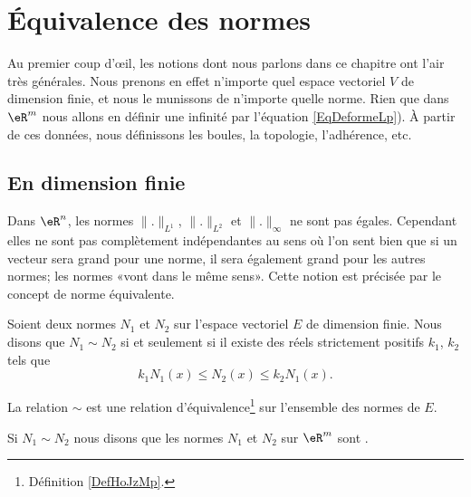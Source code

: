 \section{Équivalence des normes}
\label{normes_equiv}

Au premier coup d'œil, les notions dont nous parlons dans ce chapitre ont l'air très générales. Nous prenons en effet n'importe quel espace vectoriel \( V\) de dimension finie, et nous le munissons de n'importe quelle norme. Rien que dans \( \eR^m\) nous allons en définir une infinité par l'équation \eqref{EqDeformeLp}). À partir de ces données, nous définissons les boules, la topologie, l'adhérence, etc.

\subsection{En dimension finie}

Dans \( \eR^n\), les normes \( \| . \|_{L^1}\), \( \| . \|_{L^2}\) et \( \| . \|_{\infty}\) ne sont pas égales. Cependant elles ne sont pas complètement indépendantes au sens où l'on sent bien que si un vecteur sera grand pour une norme, il sera également grand pour les autres normes; les normes «vont dans le même sens». Cette notion est précisée par le concept de norme équivalente.

\begin{propositionDef}      \label{DefEquivNorm}\label{LEMooHAITooWdtLAN}
	Soient deux normes \( N_1\) et \( N_2\) sur l'espace vectoriel \( E\) de dimension finie. Nous disons que \( N_1\sim N_2\) si et seulement si il existe des réels strictement positifs \( k_1\), \( k_2\) tels que
	\begin{equation}
		k_1N_1(x)\leq N_2(x)\leq k_2 N_1(x).
	\end{equation}

	La relation \( \sim\) est une relation d'équivalence\footnote{Définition \ref{DefHoJzMp}.} sur l'ensemble des normes de \( E\).


	Si \( N_1\sim N_2\) nous disons que les normes \( N_1\) et \( N_2\) sur \( \eR^m\) sont .
\end{propositionDef}


